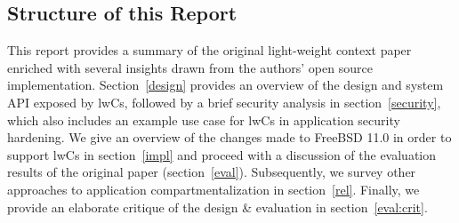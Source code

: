 \documentclass[10pt,twocolumn,a4paper]{article}
\begin{document}
\subsection{Structure of this Report}
This report provides a summary of the original light-weight context paper enriched with several insights drawn from the authors' open source implementation.
Section~\ref{design} provides an overview of the design and system API exposed by lwCs,
followed by a brief security analysis in section~\ref{security}, which also includes an example use case for lwCs in application security hardening.
We give an overview of the changes made to FreeBSD 11.0 in order to support lwCs in section~\ref{impl} and proceed with a discussion of the evaluation results of the original paper (section~\ref{eval}).
Subsequently, we survey other approaches to application compartmentalization in section~\ref{rel}.
Finally, we provide an elaborate critique of the design \& evaluation in section~\ref{eval:crit}.
\end{document}
